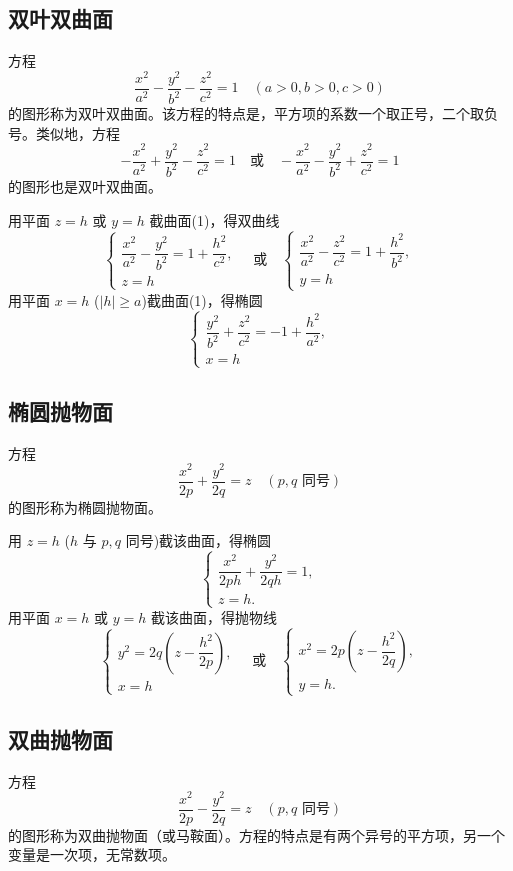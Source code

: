 \subsection{双叶双曲面}
方程
\[
\frac{x^2}{a^2} - \frac{y^2}{b^2} - \frac{z^2}{c^2} = 1 \quad (a > 0, b > 0, c > 0)\tag{1}
\]
的图形称为双叶双曲面。该方程的特点是，平方项的系数一个取正号，二个取负号。类似地，方程
\[
-\frac{x^2}{a^2} + \frac{y^2}{b^2} - \frac{z^2}{c^2} = 1 \quad \text{或} \quad -\frac{x^2}{a^2} - \frac{y^2}{b^2} + \frac{z^2}{c^2} = 1
\]
的图形也是双叶双曲面。

用平面 $z = h$ 或 $y = h$ 截曲面(1)，得双曲线
\[
\begin{cases}
\dfrac{x^2}{a^2} - \dfrac{y^2}{b^2} = 1 + \dfrac{h^2}{c^2}, \\
z = h
\end{cases}
\quad\text{或}\quad
\begin{cases}
\dfrac{x^2}{a^2} - \dfrac{z^2}{c^2} = 1 + \dfrac{h^2}{b^2}, \\
y = h
\end{cases}
\]
用平面 $x = h$ ($|h| \geq a$)截曲面(1)，得椭圆
\[
\begin{cases}
\dfrac{y^2}{b^2} + \dfrac{z^2}{c^2} = -1 + \dfrac{h^2}{a^2}, \\
x = h
\end{cases}
\]

\subsection{椭圆抛物面}
方程
\[
\frac{x^2}{2p} + \frac{y^2}{2q} = z \quad (p, q \text{ 同号})\tag{1}
\]
的图形称为椭圆抛物面。

用 $z = h$ ($h$ 与 $p, q$ 同号)截该曲面，得椭圆
\[
\begin{cases}
\dfrac{x^2}{2ph} + \dfrac{y^2}{2qh} = 1, \\
z = h.
\end{cases}
\]
用平面 $x = h$ 或 $y = h$ 截该曲面，得抛物线
\[
\begin{cases}
y^2 = 2q \left(z - \dfrac{h^2}{2p}\right), \\
x = h
\end{cases}
\quad\text{或}\quad
\begin{cases}
x^2 = 2p \left(z - \dfrac{h^2}{2q}\right), \\
y = h.
\end{cases}
\]

\subsection{双曲抛物面}
方程
\[
\frac{x^2}{2p} - \frac{y^2}{2q} = z \quad (p, q \text{ 同号})\tag{1}
\]
的图形称为双曲抛物面（或马鞍面）。方程的特点是有两个异号的平方项，另一个变量是一次项，无常数项。

